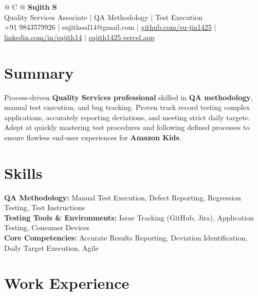 \documentclass[a4paper,10pt]{article}
\newcommand{\ulink}[2]{\href{#1}{#2}}
\begin{document}
\pagestyle{empty}

\begin{tabularx}{\linewidth}{@{} C @{}}
{\color[HTML]{000000}\fontsize{30}{35}\selectfont\bfseries Sujith S} \\[5pt]
{\fontsize{10.5}{12.5}\selectfont\color[HTML]{3A3A3A}
Quality Services Associate $|$ QA Methodology $|$ Test Execution} \\[6pt]
{\fontsize{9.5}{11.5}\selectfont\textcolor[HTML]{3A3A3A}{+91 9843579926 $|$ sujithssd14@gmail.com $|$ \ulink{https://github.com/su-jin1425}{github.com/su-jin1425} $|$ \ulink{https://linkedin.com/in/sujith14}{linkedin.com/in/sujith14} $|$ \ulink{https://sujith1425.vercel.app}{sujith1425.vercel.app}}}
\end{tabularx}

\section{Summary}
\vspace{2pt}

{\color[HTML]{0A0A0A}\fontsize{11}{14}\selectfont
Process-driven \textbf{Quality Services professional} skilled in \textbf{QA methodology}, manual test execution, and bug tracking. Proven track record testing complex applications, accurately reporting deviations, and meeting strict daily targets. Adept at quickly mastering test procedures and following defined processes to ensure flawless end-user experiences for \textbf{Amazon Kids}.}

\section{Skills}
\vspace{2pt}

{\color[HTML]{0A0A0A}\fontsize{11}{14}\selectfont
\textbf{QA Methodology:} Manual Test Execution, Defect Reporting, Regression Testing, Test Instructions \\[2pt]
\textbf{Testing Tools \& Environments:} Issue Tracking (GitHub, Jira), Application Testing, Consumer Devices \\[2pt]
\textbf{Core Competencies:} Accurate Results Reporting, Deviation Identification, Daily Target Execution, Agile}

\section{Work Experience}
\vspace{2pt}
\end{document}
